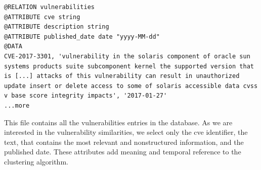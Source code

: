 \begin{lstlisting}[style=mystyle,caption=ARFF file describing a vulnerability.,label=list:arff]
@RELATION vulnerabilities
@ATTRIBUTE cve string
@ATTRIBUTE description string
@ATTRIBUTE published_date date "yyyy-MM-dd"
@DATA
CVE-2017-3301, 'vulnerability in the solaris component of oracle sun systems products suite subcomponent kernel the supported version that is [...] attacks of this vulnerability can result in unauthorized update insert or delete access to some of solaris accessible data cvss v base score integrity impacts', '2017-01-27'
...more
\end{lstlisting}


This file contains all the vulnerabilities entries in the database. 
As we are interested in the vulnerability similarities, we select only the \gls{cve} identifier, the text, that contains the most relevant and nonstructured information, and the published date.
These attributes add meaning and temporal reference to the clustering algorithm.


